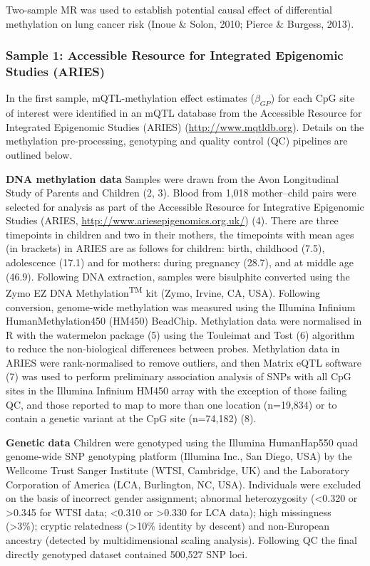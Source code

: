 \documentclass[11pt,twoside]{bristolthesis}
\begin{document}
Two-sample MR was used to establish potential causal effect of differential methylation on lung cancer risk (Inoue \& Solon, 2010; Pierce \& Burgess, 2013).

\hypertarget{sample-1-accessible-resource-for-integrated-epigenomic-studies-aries}{%
\subsubsection{Sample 1: Accessible Resource for Integrated Epigenomic Studies (ARIES)}\label{sample-1-accessible-resource-for-integrated-epigenomic-studies-aries}}

In the first sample, mQTL-methylation effect estimates (\(\beta_{GP}\)) for each CpG site of interest were identified in an mQTL database from the Accessible Resource for Integrated Epigenomic Studies (ARIES) (\url{http://www.mqtldb.org}). Details on the methylation pre-processing, genotyping and quality control (QC) pipelines are outlined below.

\textbf{DNA methylation data}
Samples were drawn from the Avon Longitudinal Study of Parents and Children (2, 3). Blood from 1,018 mother--child pairs were selected for analysis as part of the Accessible Resource for Integrative Epigenomic Studies (ARIES, \url{http://www.ariesepigenomics.org.uk/}) (4). There are three timepoints in children and two in their mothers, the timepoints with mean ages (in brackets) in ARIES are as follows for children: birth, childhood (7.5), adolescence (17.1) and for mothers: during pregnancy (28.7), and at middle age (46.9). Following DNA extraction, samples were bisulphite converted using the Zymo EZ DNA Methylation\textsuperscript{TM} kit (Zymo, Irvine, CA, USA). Following conversion, genome-wide methylation was measured using the Illumina Infinium HumanMethylation450 (HM450) BeadChip. Methylation data were normalised in R with the watermelon package (5) using the Touleimat and Tost (6) algorithm to reduce the non-biological differences between probes. Methylation data in ARIES were rank-normalised to remove outliers, and then Matrix eQTL software (7) was used to perform preliminary association analysis of SNPs with all CpG sites in the Illumina Infinium HM450 array with the exception of those failing QC, and those reported to map to more than one location (n=19,834) or to contain a genetic variant at the CpG site (n=74,182) (8).

\textbf{Genetic data}
Children were genotyped using the Illumina HumanHap550 quad genome-wide SNP genotyping platform (Illumina Inc., San Diego, USA) by the Wellcome Trust Sanger Institute (WTSI, Cambridge, UK) and the Laboratory Corporation of America (LCA, Burlington, NC, USA). Individuals were excluded on the basis of incorrect gender assignment; abnormal heterozygosity (\textless0.320 or \textgreater0.345 for WTSI data; \textless0.310 or \textgreater0.330 for LCA data); high missingness (\textgreater3\%); cryptic relatedness (\textgreater10\% identity by descent) and non-European ancestry (detected by multidimensional scaling analysis). Following QC the final directly genotyped dataset contained 500,527 SNP loci.
\end{document}
